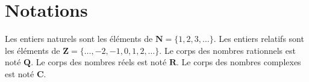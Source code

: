 \section{Notations}
\label{section-notation}

\noindent
Les entiers naturels sont les éléments de
$\mathbf{N} = \{1, 2, 3, \ldots\}$.
Les entiers relatifs sont les éléments de
$\mathbf{Z} = \{\ldots, -2, -1, 0, 1, 2, \ldots\}$.
Le corps des nombres rationnels est noté $\mathbf{Q}$.
Le corps des nombres réels est noté $\mathbf{R}$.
Le corps des nombres complexes est noté $\mathbf{C}$.







